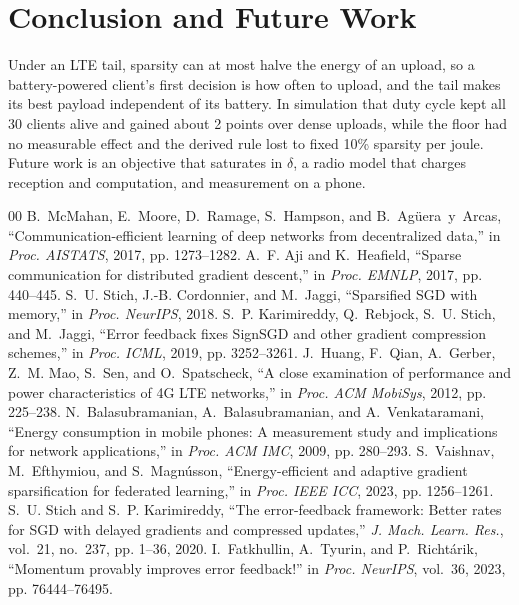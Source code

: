 \documentclass[conference,a4paper]{IEEEtran}
\begin{document}
\section{Conclusion and Future Work}
Under an LTE tail, sparsity can at most halve the energy of an upload, so a battery-powered client's first decision is how often to upload, and the tail makes its best payload independent of its battery. In simulation that duty cycle kept all 30 clients alive and gained about 2 points over dense uploads, while the floor had no measurable effect and the derived rule lost to fixed 10\% sparsity per joule. Future work is an objective that saturates in $\delta$, a radio model that charges reception and computation, and measurement on a phone.

\begin{thebibliography}{00}
 B.~McMahan, E.~Moore, D.~Ramage, S.~Hampson, and B.~Ag\"uera~y~Arcas, ``Communication-efficient learning of deep networks from decentralized data,'' in \emph{Proc. AISTATS}, 2017, pp. 1273--1282.
 A.~F. Aji and K.~Heafield, ``Sparse communication for distributed gradient descent,'' in \emph{Proc. EMNLP}, 2017, pp. 440--445.
 S.~U. Stich, J.-B. Cordonnier, and M.~Jaggi, ``Sparsified SGD with memory,'' in \emph{Proc. NeurIPS}, 2018.
 S.~P. Karimireddy, Q.~Rebjock, S.~U. Stich, and M.~Jaggi, ``Error feedback fixes SignSGD and other gradient compression schemes,'' in \emph{Proc. ICML}, 2019, pp. 3252--3261.
 J.~Huang, F.~Qian, A.~Gerber, Z.~M. Mao, S.~Sen, and O.~Spatscheck, ``A close examination of performance and power characteristics of 4G LTE networks,'' in \emph{Proc. ACM MobiSys}, 2012, pp. 225--238.
 N.~Balasubramanian, A.~Balasubramanian, and A.~Venkataramani, ``Energy consumption in mobile phones: A measurement study and implications for network applications,'' in \emph{Proc. ACM IMC}, 2009, pp. 280--293.
 S.~Vaishnav, M.~Efthymiou, and S.~Magn\'usson, ``Energy-efficient and adaptive gradient sparsification for federated learning,'' in \emph{Proc. IEEE ICC}, 2023, pp. 1256--1261.
 S.~U. Stich and S.~P. Karimireddy, ``The error-feedback framework: Better rates for SGD with delayed gradients and compressed updates,'' \emph{J. Mach. Learn. Res.}, vol.~21, no.~237, pp. 1--36, 2020.
 I.~Fatkhullin, A.~Tyurin, and P.~Richt\'arik, ``Momentum provably improves error feedback!'' in \emph{Proc. NeurIPS}, vol.~36, 2023, pp. 76444--76495.

\end{thebibliography}
\end{document}
